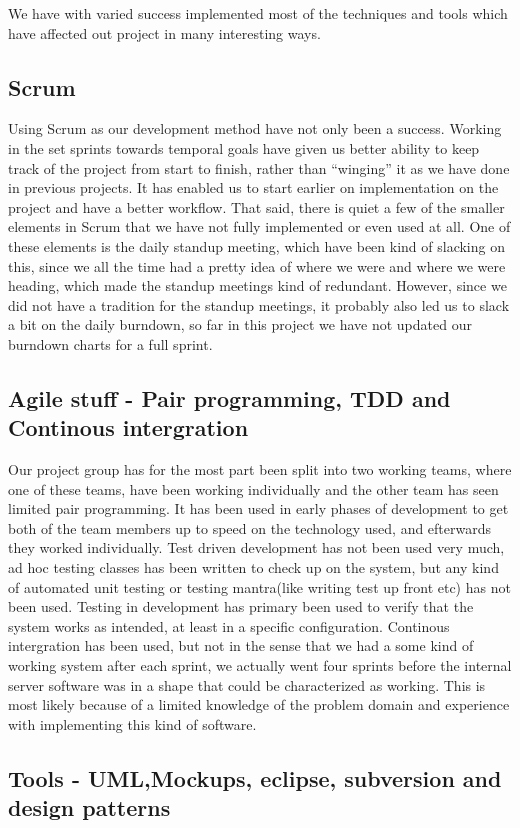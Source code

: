 We have with varied success implemented most of the techniques and tools which have affected out project in many interesting ways.

\subsection*{Scrum}
Using Scrum as our development method have not only been a success. Working in the set sprints towards temporal goals
have given us better ability to keep track of the project from start to finish, rather than ``winging'' it as we have done in previous projects.
It has enabled us to start earlier on implementation on the project and have a better workflow.
That said, there is quiet a few of the smaller elements in Scrum that we have not fully implemented or even used at all.
One of these elements is the daily standup meeting, which have been kind of slacking on this, since we all the time had a pretty idea of where we
were and where we were heading, which made the standup meetings kind of redundant. However, since we did not have a tradition for the standup meetings, it probably also led us to slack
a bit on the daily burndown, so far in this project we have not updated our burndown charts for a full sprint.
 
\subsection*{Agile stuff - Pair programming, TDD and Continous intergration}
Our project group has for the most part been split into two working teams, where one of these teams, have been working individually and the other team has seen limited pair programming.
It has been used in early phases of development to get both of the team members up to speed on the technology used, and efterwards they worked individually.
Test driven development has not been used very much, ad hoc testing classes has been written to check up on the system, but any kind of automated unit testing or testing mantra(like writing test up front etc)
has not been used. Testing in development has primary been used to verify that the system works as intended, at least in a specific configuration.
Continous intergration has been used, but not in the sense that we had a some kind of working system after each sprint, we actually went four sprints before the internal server software was in a shape
that could be characterized as working. This is most likely because of a limited knowledge of the problem domain and experience with implementing this kind of software.

\subsection*{Tools - UML,Mockups, eclipse, subversion and design patterns}